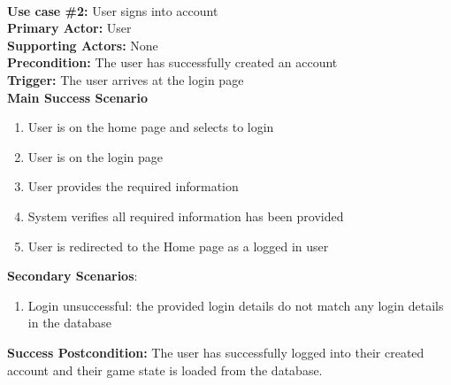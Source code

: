 \documentclass{article}
\begin{document}
\noindent\\
\textbf{Use case \#2:} User signs into account\\
\textbf{Primary Actor:} User\\
\textbf{Supporting Actors:} None\\
\textbf{Precondition:} The user has successfully created an account\\
\textbf{Trigger:} The user arrives at the login page\\
\textbf{Main Success Scenario}
\begin{enumerate}
    \item User is on the home page and selects to login
    \item User is on the login page
    \item User provides the required information
    \item System verifies all required information has been provided
    \item User is redirected to the Home page as a logged in user
\end{enumerate}
\textbf{Secondary Scenarios}:
\begin{enumerate}
    \item Login unsuccessful: the provided login details do not match any login details in the database
\end{enumerate}
\textbf{Success Postcondition:} The user has successfully logged into their created account and their game state is loaded from the database. \newline
\end{document}
